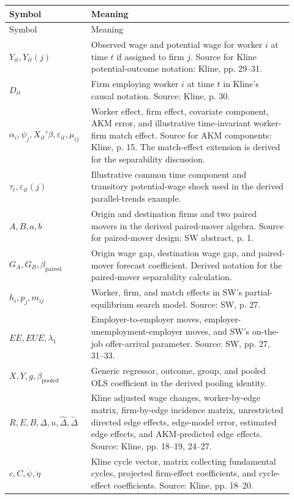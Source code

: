 ﻿\documentclass[11pt]{article}
\newcommand{\1}{\mathbf{1}}
\begin{document}
\begin{longtable}{>{\raggedright\arraybackslash}p{0.24\linewidth}
                >{\raggedright\arraybackslash}p{0.68\linewidth}}
\toprule
Symbol & Meaning \\
\midrule
\endfirsthead
\toprule
Symbol & Meaning \\
\midrule
\endhead
$Y_{it},Y_{it}(j)$ & Observed wage and potential wage for worker $i$ at time $t$ if assigned to firm $j$. Source for Kline potential-outcome notation: Kline, pp. 29--31. \\
$D_{it}$ & Firm employing worker $i$ at time $t$ in Kline's causal notation. Source: Kline, p. 30. \\
$\alpha_i,\psi_j,X_{it}'\beta,\varepsilon_{it},\mu_{ij}$ & Worker effect, firm effect, covariate component, AKM error, and illustrative time-invariant worker-firm match effect. Source for AKM components: Kline, p. 15. The match-effect extension is derived for the separability discussion. \\
$\tau_t,\varepsilon_{it}(j)$ & Illustrative common time component and transitory potential-wage shock used in the derived parallel-trends example. \\
$A,B,a,b$ & Origin and destination firms and two paired movers in the derived paired-mover algebra. Source for paired-mover design: SW abstract, p. 1. \\
$G_A,G_B,\beta_{\mathrm{paired}}$ & Origin wage gap, destination wage gap, and paired-mover forecast coefficient. Derived notation for the paired-mover separability calculation. \\
$h_i,p_j,m_{ij}$ & Worker, firm, and match effects in SW's partial-equilibrium search model. Source: SW, p. 27. \\
$EE,EUE,\lambda_1$ & Employer-to-employer moves, employer-unemployment-employer moves, and SW's on-the-job offer-arrival parameter. Source: SW, pp. 27, 31--33. \\
$X,Y,g,\beta_{\mathrm{pooled}}$ & Generic regressor, outcome, group, and pooled OLS coefficient in the derived pooling identity. \\
$R,E,B,\Delta,u,\hat\Delta,\tilde\Delta$ & Kline adjusted wage changes, worker-by-edge matrix, firm-by-edge incidence matrix, unrestricted directed edge effects, edge-model error, estimated edge effects, and AKM-predicted edge effects. Source: Kline, pp. 18--19, 24--27. \\
$c,C,\dot\psi,\dot\eta$ & Kline cycle vector, matrix collecting fundamental cycles, projected firm-effect coefficients, and cycle-effect coefficients. Source: Kline, pp. 18--20. \\

\end{longtable}
\end{document}
